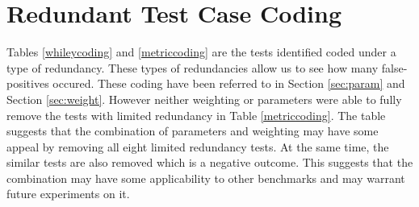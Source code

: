 \section{Redundant Test Case Coding}

Tables \ref{whileycoding} and \ref{metriccoding} are the tests identified coded under a type of redundancy. These types of redundancies allow us to see how many false-positives occured. These coding have been referred to in Section \ref{sec:param} and Section \ref{sec:weight}. However neither weighting or parameters were able to fully remove the tests with limited redundancy in Table \ref{metriccoding}. The table suggests that the combination of parameters and weighting may have some appeal by removing all eight limited redundancy tests. At the same time, the similar tests are also removed which is a negative outcome. This suggests that the combination may have some applicability to other benchmarks and may warrant future experiments on it.

